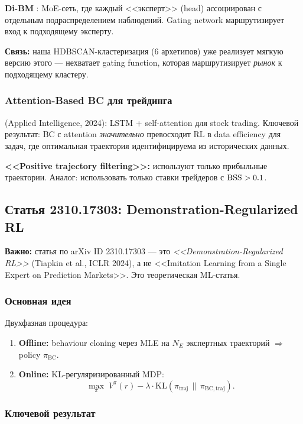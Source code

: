 \textbf{Di-BM} \citep{dibm2025}: MoE-сеть, где каждый <<эксперт>> (head)
ассоциирован с отдельным подраспределением наблюдений.
Gating network маршрутизирует вход к подходящему эксперту.

\textbf{Связь:} наша HDBSCAN-кластеризация (6 архетипов)
уже реализует мягкую версию этого --- нехватает gating function,
которая маршрутизирует \emph{рынок} к подходящему кластеру.

\subsubsection{Attention-Based BC для трейдинга}

\citet{attention_bc2024} (Applied Intelligence, 2024):
LSTM + self-attention для stock trading.
Ключевой результат: BC с attention \emph{значительно} превосходит RL
в data efficiency для задач, где оптимальная траектория
идентифицируема из исторических данных.

\textbf{<<Positive trajectory filtering>>:}
используют только прибыльные траектории.
Аналог: использовать только ставки трейдеров с $\mathrm{BSS} > 0.1$.

\subsection{Статья 2310.17303: Demonstration-Regularized RL}

\textbf{Важно:} статья по arXiv ID 2310.17303 --- это \emph{<<Demonstration-Regularized RL>>}
(Tiapkin et al., ICLR 2024), а не <<Imitation Learning from a Single Expert on Prediction Markets>>.
Это теоретическая ML-статья.

\subsubsection{Основная идея}

Двухфазная процедура:
\begin{enumerate}[nosep]
  \item \textbf{Offline:} behaviour cloning через MLE на $N_E$ экспертных траекторий
    $\Rightarrow$ policy $\pi_{\mathrm{BC}}$.
  \item \textbf{Online:} KL-регуляризированный MDP:
    \[
    \max_{\pi}\; V^{\pi}(r) - \lambda \cdot \mathrm{KL}(\pi_{\mathrm{traj}} \,\|\, \pi_{\mathrm{BC},\mathrm{traj}}).
    \]
\end{enumerate}

\subsubsection{Ключевой результат}

